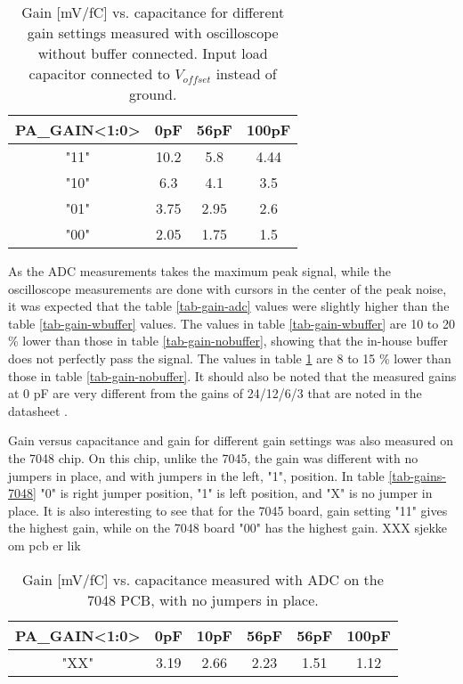 \documentclass[../main/thesis.tex]{subfiles}
\begin{document}
\begin{table}[h!]
	\begin{center}
		\caption{Gain [mV/fC] vs. capacitance for different gain settings measured with oscilloscope without buffer connected. Input load capacitor connected to $V_{offset}$ instead of ground.}
		\label{tab-gain-nobuffer-offset}
		\begin{tabular}{cccc}\toprule
			\textbf{PA\_GAIN<1:0>} & \textbf{0pF}  & \textbf{56pF} & \textbf{100pF} \\ \midrule
			"11"     & 10.2 & 5.8  & 4.44  \\
			"10"     & 6.3  & 4.1  & 3.5   \\
			"01"     & 3.75 & 2.95 & 2.6   \\
			"00"     & 2.05 & 1.75 & 1.5   \\ \bottomrule
		\end{tabular}
	\end{center}
\end{table}

As the ADC measurements takes the maximum peak signal, while the oscilloscope measurements are done with cursors in the center of the peak noise, it was expected that the table \ref{tab-gain-adc} values were slightly higher than the table \ref{tab-gain-wbuffer} values. The values in table \ref{tab-gain-wbuffer} are 10 to 20 \% lower than those in table \ref{tab-gain-nobuffer}, showing that the in-house buffer does not perfectly pass the signal. The values in table \ref{tab-gain-nobuffer-offset} are 8 to 15 \% lower than those in table \ref{tab-gain-nobuffer}. It should also be noted that the measured gains at 0 pF are very different from the gains of 24/12/6/3 that are noted in the datasheet \citep{IDE1180}.

Gain versus capacitance and gain for different gain settings was also measured on the 7048 chip. On this chip, unlike the 7045, the gain was different with no jumpers in place, and with jumpers in the left, "1", position. In table \ref{tab-gains-7048} "0" is right jumper position, "1" is left position, and "X" is no jumper in place. It is also interesting to see that for the 7045 board, gain setting "11" gives the highest gain, while on the 7048 board "00" has the highest gain. XXX sjekke om pcb er lik

\begin{table}[h!]
	\begin{center}
		\caption{Gain [mV/fC] vs. capacitance measured with ADC on the 7048 PCB, with no jumpers in place.}
		\label{tab-gain-adc-7048}
		\begin{tabular}{cccccc}\toprule
			\textbf{PA\_GAIN<1:0>} & \textbf{0pF}  & \textbf{10pF} & \textbf{56pF} & \textbf{56pF} & \textbf{100pF} \\ \midrule
			"XX"     & 3.19 & 2.66  & 2.23  & 1.51 & 1.12   \\ \bottomrule
		\end{tabular}
	\end{center}
\end{table}
\end{document}
